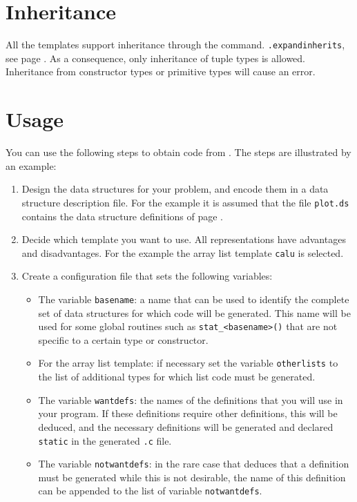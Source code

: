 \section{Inheritance}
All the {\C} templates support inheritance through the {\Tm} command.
\verb'.expandinherits', see page \pageref{s.expandinherits}.
As a consequence, only inheritance of tuple types is allowed. Inheritance
from constructor types or primitive types will cause an error.
\section{Usage}
\label{s.quickintro}
You can use the following steps to obtain {\C} code from {\Tm}.
The steps are illustrated by an example:
\begin{enumerate}
\item
Design the data structures for your problem,
and encode them in a data structure description file.
For the example it is assumed that the file {\tt plot.ds} contains the
data structure definitions of page \pageref{plotds}.
\item
Decide which template you want to use.
All representations have advantages and disadvantages.
For the example the array list template {\tt calu} is selected.
\item
Create a configuration file that sets the following {\Tm} variables:
\begin{itemize}
\item
The variable {\tt basename}:
a name that can be used to identify the complete set of data structures
for which code will be generated. This name will be used for some global
routines such as \verb'stat_<basename>()' that are not specific to
a certain type or constructor.
\item
For the array list template: if necessary set the variable {\tt otherlists}
to the list of additional types for which list code must be generated.
\item
The variable {\tt wantdefs}: the names of the definitions that you
will use in your program.
If these definitions require other definitions,
this will be deduced, and the necessary definitions will be generated and
declared {\tt static} in the generated {\tt .c} file.
\item
The variable {\tt notwantdefs}:
in the rare case that {\Tm} deduces that a definition must be generated
while this is not desirable,
the name of this definition can be appended to the list of
variable {\tt notwantdefs}.
\end{itemize}

\end{enumerate}
